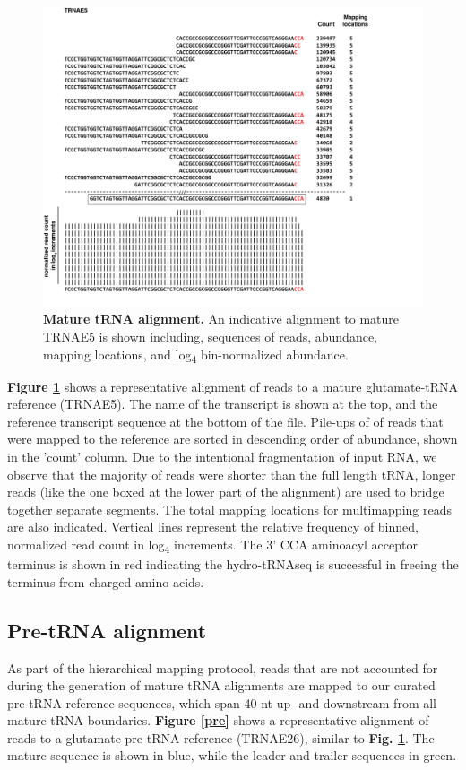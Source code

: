 \documentclass[12pt]{rockefeller}
\newcommand{\sub}[1]{\textsubscript{#1}}
\begin{document}
\begin{figure}[!ht]%
\centering
\includegraphics[width=\textwidth]{mature.png}%
\caption[Mature tRNA alignment]{\textbf{Mature tRNA alignment.} An indicative alignment to mature TRNAE5 is shown including, sequences of reads, abundance, mapping locations, and log\sub{4} bin-normalized abundance.}
\centering
\label{mature}%
\end{figure}

\textbf{Figure \ref{mature}} shows a representative alignment of reads to a mature glutamate-tRNA reference (TRNAE5). The name of the transcript is shown at the top, and the reference transcript sequence at the bottom of the file. Pile-ups of of reads that were mapped to the reference are sorted in descending order of abundance, shown in the 'count' column. Due to the intentional fragmentation of input RNA, we observe that the majority of reads were shorter than the full length tRNA, longer reads (like the one boxed at the lower part of the alignment) are used to bridge together separate segments. The total mapping locations for multimapping reads are also indicated.  Vertical lines represent the relative frequency of binned, normalized read count in log\sub{4} increments. The 3’ CCA aminoacyl acceptor terminus is shown in red indicating the hydro-tRNAseq is successful in freeing the terminus from charged amino acids. 

\subsection{Pre-tRNA alignment}
As part of the hierarchical mapping protocol, reads that are not accounted for during the generation of mature tRNA alignments are mapped to our curated pre-tRNA reference sequences, which span 40 nt up- and downstream from all mature tRNA boundaries. \textbf{Figure \ref{pre}} shows a representative alignment of reads to a glutamate pre-tRNA reference (TRNAE26), similar to \textbf{Fig. \ref{mature}}. The mature sequence is shown in blue, while the leader and trailer sequences in green. 
\end{document}
